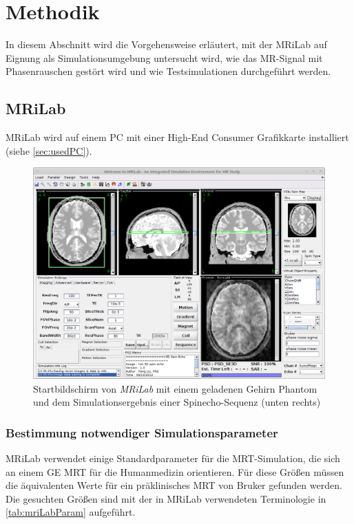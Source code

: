 \chapter{Methodik}
In diesem Abschnitt wird die Vorgehensweise erläutert, mit der MRiLab auf Eignung als Simulationsumgebung untersucht wird, wie das MR-Signal mit Phasenrauschen gestört wird und wie Testsimulationen durchgeführt werden.

\section{MRiLab}
MRiLab wird auf einem PC mit einer High-End Consumer Grafikkarte installiert (siehe \autoref{sec:usedPC}). 

\begin{figure}[H]
	\centering
	\includegraphics[width=\textwidth]{img/mrilabScreenshot.png}
	\caption[MRiLab Startbildschirm]{Startbildschirm von \textit{MRiLab} mit einem geladenen Gehirn Phantom und dem Simulationsergebnis einer Spinecho-Sequenz (unten rechts)}
	\label{fig:mrilabscreenshot}
\end{figure}

\subsection{Bestimmung notwendiger Simulationsparameter}
MRiLab verwendet einige Standardparameter für die MRT-Simulation, die sich an einem GE MRT für die Humanmedizin orientieren. Für diese Größen müssen die äquivalenten Werte für ein präklinisches MRT von Bruker gefunden werden. Die gesuchten Größen sind mit der in MRiLab verwendeten Terminologie in \autoref{tab:mriLabParam} aufgeführt.

